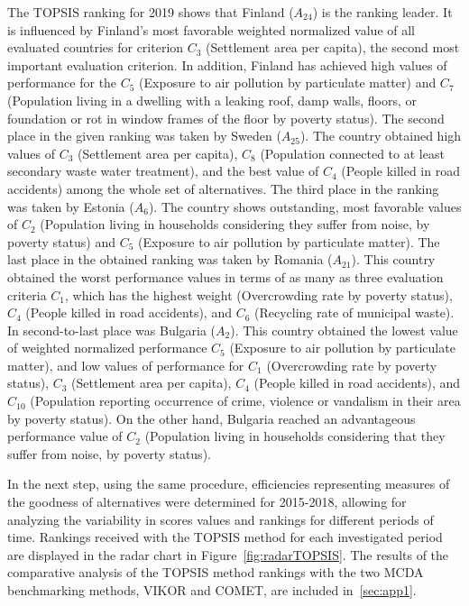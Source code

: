\documentclass[5p,times]{elsarticle}
\begin{document}
The TOPSIS ranking for 2019 shows that Finland ($A_{24}$) is the ranking leader. It is influenced by Finland's most favorable weighted normalized value of all evaluated countries for criterion $C_{3}$ (Settlement area per capita), the second most important evaluation criterion. In addition, Finland has achieved high values of performance for the $C_{5}$ (Exposure to air pollution by particulate matter) and $C_{7}$ (Population living in a dwelling with a leaking roof, damp walls, floors, or foundation or rot in window frames of the floor by poverty status). The second place in the given ranking was taken by Sweden ($A_{25}$). The country obtained high values of $C_{3}$ (Settlement area per capita), $C_{8}$ (Population connected to at least secondary waste water treatment), and the best value of $C_{4}$ (People killed in road accidents) among the whole set of alternatives. The third place in the ranking was taken by Estonia ($A_{6}$). The country shows outstanding, most favorable values of $C_{2}$ (Population living in households considering they suffer from noise, by poverty status) and $C_{5}$ (Exposure to air pollution by particulate matter). The last place in the obtained ranking was taken by Romania ($A_{21}$). This country obtained the worst performance values in terms of as many as three evaluation criteria $C_{1}$, which has the highest weight (Overcrowding rate by poverty status), $C_{4}$ (People killed in road accidents), and $C_{6}$ (Recycling rate of municipal waste). In second-to-last place was Bulgaria ($A_{2}$). This country obtained the lowest value of weighted normalized performance $C_{5}$ (Exposure to air pollution by particulate matter), and low values of performance for $C_{1}$ (Overcrowding rate by poverty status), $C_{3}$ (Settlement area per capita), $C_{4}$ (People killed in road accidents), and $C_{10}$ (Population reporting occurrence of crime, violence or vandalism in their area by poverty status). On the other hand, Bulgaria reached an advantageous performance value of $C_{2}$ (Population living in households considering that they suffer from noise, by poverty status).

In the next step, using the same procedure, efficiencies representing measures of the goodness of alternatives were determined for 2015-2018, allowing for analyzing the variability in scores values and rankings for different periods of time. Rankings received with the TOPSIS method for each investigated period are displayed in the radar chart in Figure~\ref{fig:radarTOPSIS}. The results of the comparative analysis of the TOPSIS method rankings with the two MCDA benchmarking methods, VIKOR and COMET, are included in~\ref{sec:app1}.
\end{document}
